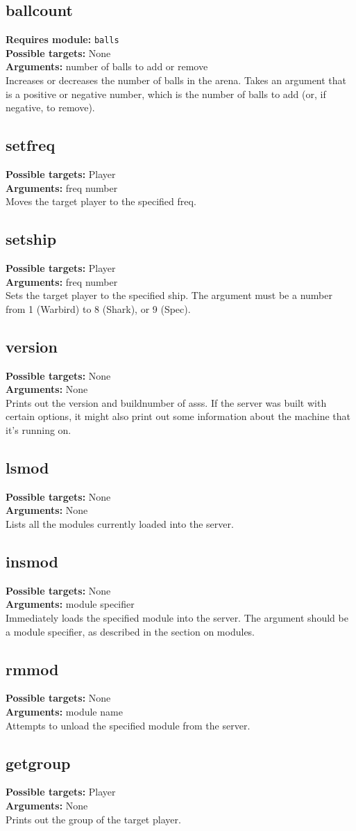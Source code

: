 \documentclass{article}
\newcommand{\requiremod}[1]{\noindent\textbf{Requires module:} \texttt{#1}\\}
\newcommand{\targets}[1]{\noindent\textbf{Possible targets:} #1\\}
\newcommand{\args}[1]{\noindent\textbf{Arguments:} #1\\}
\begin{document}
\subsection{ballcount}
\requiremod{balls}
\targets{None}
\args{number of balls to add or remove}
Increases or decreases the number of balls in the arena. Takes an
argument that is a positive or negative number, which is the number of
balls to add (or, if negative, to remove).

\subsection{setfreq}
\targets{Player}
\args{freq number}
Moves the target player to the specified freq.

\subsection{setship}
\targets{Player}
\args{freq number}
Sets the target player to the specified ship. The argument must be a
number from 1 (Warbird) to 8 (Shark), or 9 (Spec).

\subsection{version}
\targets{None}
\args{None}
Prints out the version and buildnumber of asss. If the server was built
with certain options, it might also print out some information about the
machine that it's running on.

\subsection{lsmod}
\targets{None}
\args{None}
Lists all the modules currently loaded into the server.

\subsection{insmod}
\targets{None}
\args{module specifier}
Immediately loads the specified module into the server. The argument
should be a module specifier, as described in the section on modules.

\subsection{rmmod}
\targets{None}
\args{module name}
Attempts to unload the specified module from the server.

\subsection{getgroup}
\targets{Player}
\args{None}
Prints out the group of the target player.
\end{document}
